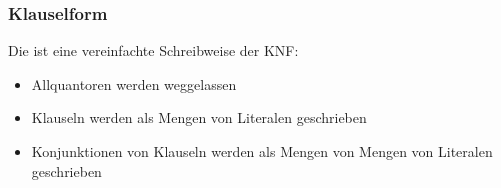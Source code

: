 \documentclass[onlymath]{beamer}
\begin{document}
\begin{frame}\frametitle{Klauselform}

Die  ist eine vereinfachte Schreibweise der KNF:
\begin{itemize}
\item Allquantoren werden weggelassen
\item Klauseln werden als Mengen von Literalen geschrieben
\item Konjunktionen von Klauseln werden als Mengen von Mengen von Literalen geschrieben
\end{itemize}


\end{frame}

\end{document}
